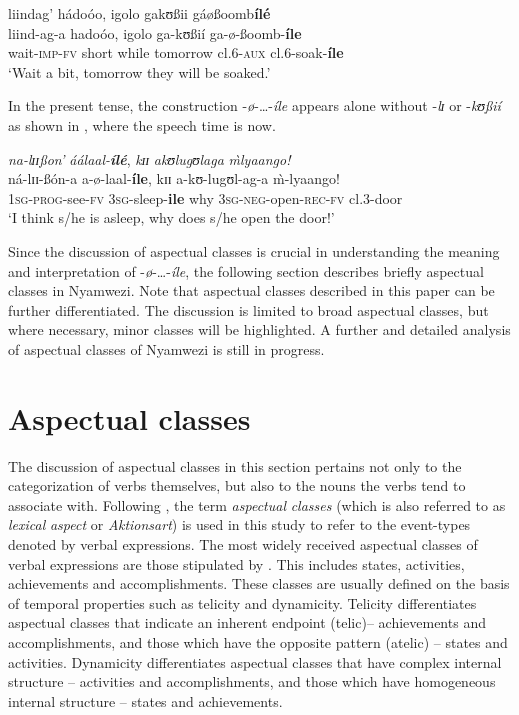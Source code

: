 \documentclass[output=paper]{langscibook}
\begin{document}
\ea \label{ex:kanijo:6}
\glll liindag’        hádoóo,      igolo         gakʊßii   gáøßoomb\textbf{ílé}\\
liind-ag-a     hadoóo,      igolo         ga-kʊßií  ga-ø-ßoomb-\textbf{íle}\\
wait-\textsc{imp}-\textsc{fv} short while tomorrow cl.6-\textsc{aux} cl.6-soak-\textbf{íle}\\
\glt ‘Wait a bit, tomorrow they will be soaked.’
\z


In the present tense, the construction -\textit{ø}-\ldots-\textit{íle} appears alone without -\textit{l}{\textit{ɪ}} or -\textit{kʊßií} as shown in , where the speech time is now. 

\ea \label{ex:kanijo:7}
\glll \textit{na-lɪɪ}\textit{ßon’}           \textit{áálaal-}\textbf{\textit{ílé}},    \textit{k}{\textit{ɪɪ}} \textit{akʊ}\textit{lugʊlaga}              \textit{\`{m}lyaango!}\\
ná-lɪɪ-ßón-a           a-ø-laal-\textbf{íle},   kɪɪ  a-kʊ-lugʊl-ag-a            \`{m}-lyaango!\\
\textsc{1sg}-\textsc{prog}-see-\textsc{fv} \textsc{3sg}-sleep-\textbf{ile} why \textsc{3sg}-\textsc{neg}-open-\textsc{rec}-\textsc{fv} cl.3-door\\
\glt ‘I think s/he is asleep, why does s/he open the door!’
\z

Since the discussion of aspectual classes is crucial in understanding the meaning and interpretation of -\textit{ø}-…-\textit{íle}, the following section describes briefly aspectual classes in Nyamwezi. Note that aspectual classes described in this paper can be further differentiated. The discussion is limited to broad aspectual classes, but where necessary, minor classes will be highlighted. A further and detailed analysis of aspectual classes of Nyamwezi is still in progress. 


\section{Aspectual classes}
\label{sec:kanijo:3}

The discussion of aspectual classes in this section pertains not only to the categorization of verbs themselves, but also to the nouns the verbs tend to associate with. Following \citet[1]{Rothstein2004}, the term \textit{aspectual} \textit{classes} (which is also referred to as \textit{lexical} \textit{aspect} or \textit{Aktionsart}) is used in this study to refer to the event-types denoted by verbal expressions. The most widely received aspectual classes of verbal expressions are those stipulated by \citet{Vendler1957}. This includes states, activities, achievements and accomplishments. These classes are usually defined on the basis of temporal properties such as telicity and dynamicity. Telicity differentiates aspectual classes that indicate an inherent endpoint (telic)-- achievements and accomplishments, and those which have the opposite pattern (atelic) -- states and activities. Dynamicity differentiates aspectual classes that have complex internal structure -- activities and accomplishments, and those which have homogeneous internal structure -- states and achievements.
\end{document}
